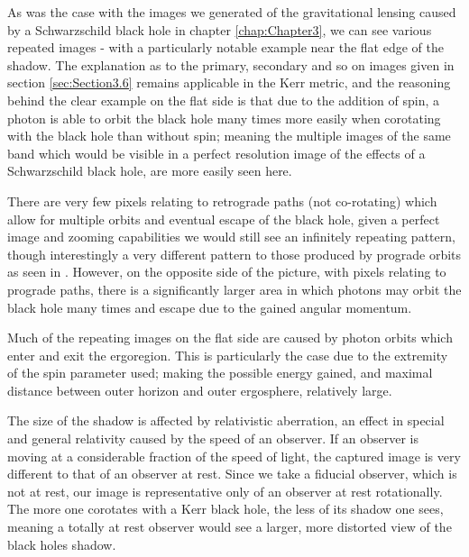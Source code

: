 \documentclass[oneside,openright,frontopenright, singlespacing]{dmathesis}
\begin{document}
\vspace{1em}
	As was the case with the images we generated of the gravitational lensing caused by a Schwarzschild black hole in chapter \ref{chap:Chapter3}, we can see various repeated images - with a particularly notable example near the flat edge of the shadow. The explanation as to the primary, secondary and so on images given in section \ref{sec:Section3.6} remains applicable in the Kerr metric, and the reasoning behind the clear example on the flat side is that due to the addition of spin, a photon is able to orbit the black hole many times more easily when corotating with the black hole than without spin; meaning the multiple images of the same band which would be visible in a perfect resolution image of the effects of a Schwarzschild black hole, are more easily seen here. 

\vspace{1em}
	There are very few pixels relating to retrograde paths (not co-rotating) which allow for multiple orbits and eventual escape of the black hole, given a perfect image and zooming capabilities we would still see an infinitely repeating pattern, though interestingly a very different pattern to those produced by prograde orbits as seen in \cite[pg. 8-11]{seeingRelativity}. However, on the opposite side of the picture, with pixels relating to prograde paths, there is a significantly larger area in which photons may orbit the black hole many times and escape due to the gained angular momentum.

\vspace{1em}
	Much of the repeating images on the flat side are caused by photon orbits which enter and exit the ergoregion. This is particularly the case due to the extremity of the spin parameter used; making the possible energy gained, and maximal distance between outer horizon and outer ergosphere, relatively large.

\vspace{1em}
	The size of the shadow is affected by relativistic aberration, an effect in special and general relativity caused by the speed of an observer. If an observer is moving at a considerable fraction of the speed of light, the captured image is very different to that of an observer at rest. Since we take a fiducial observer, which is not at rest, our image is representative only of an observer at rest rotationally. The more one corotates with a Kerr black hole, the less of its shadow one sees, meaning a totally at rest observer would see a larger, more distorted view of the black holes shadow.
\end{document}
